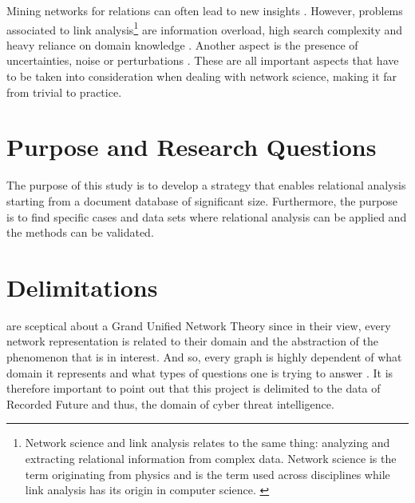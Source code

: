 Mining networks for relations can often lead to new insights \cite{hendrix2010}. However, problems associated to link analysis\footnote{Network science and link analysis relates to the same thing: analyzing and extracting relational information from complex data. Network science is the term originating from physics and is the term used across disciplines while link analysis has its origin in computer science. \cite{fouss2016algorithms}} are information overload, high search complexity and heavy reliance on domain knowledge \cite{hendrix2010,schroeder2007}. Another aspect is the presence of uncertainties, noise or perturbations \cite{hendrix2010}. These are all important aspects that have to be taken into consideration when dealing with network science, making it far from trivial to practice. 

\section{Purpose and Research Questions}

The purpose of this study is to develop a strategy that enables relational analysis starting from a document database of significant size. Furthermore, the purpose is to find specific cases and data sets where relational analysis can be applied and the methods can be validated.

\begin{comment}
The purpose of this study is to investigate the possibility to transform a database into a relational based graph database in order to reveal new relations and draw more conclusions about the existing data. The purpose can be broken down into the following three research questions:
\begin{enumerate}
	\item Are there classes or specific types of relations that are of special significance for cyber threat analysis?
    \item What kind of network analysis and statistics is important when performing cyber threat analysis?
    \item What methodology and design is suitable for extracting hidden relations in a big database within reasonable execution time?
\end{enumerate}
\end{comment}

\section{Delimitations}
\citet{brandes2013} are sceptical about a Grand Unified Network Theory since in their view, every network representation is related to their domain and the abstraction of the phenomenon that is in interest. And so, every graph is highly dependent of what domain it represents and what types of questions one is trying to answer \cite{hendrix2010, schroeder2007}. It is therefore important to point out that this project is delimited to the data of Recorded Future and thus, the domain of cyber threat intelligence. 

